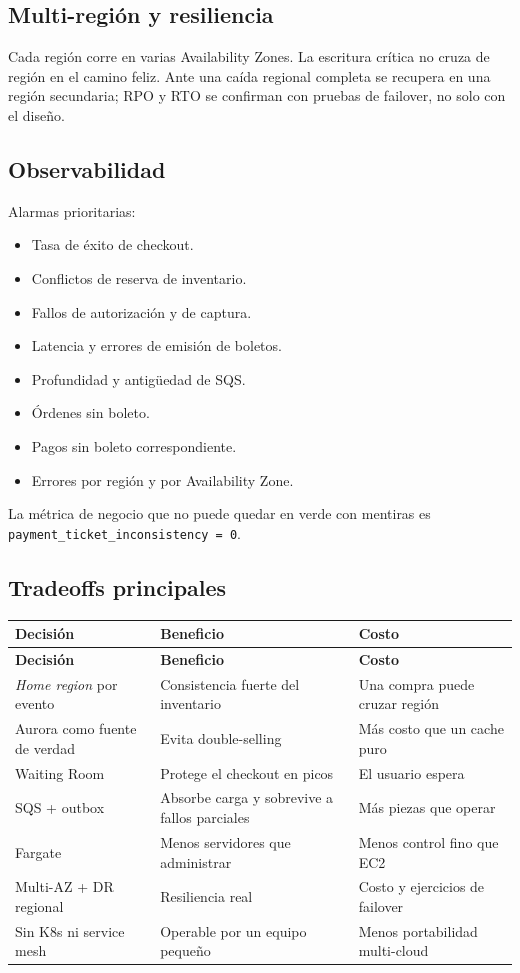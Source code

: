 \documentclass[11pt,a4paper]{article}
\begin{document}
\subsection{Multi-región y resiliencia}

Cada región corre en varias Availability Zones. La escritura crítica no cruza de región en el camino feliz. Ante una caída regional completa se recupera en una región secundaria; RPO y RTO se confirman con pruebas de failover, no solo con el diseño.

\subsection{Observabilidad}

Alarmas prioritarias:

\begin{itemize}
    \item Tasa de éxito de checkout.
    \item Conflictos de reserva de inventario.
    \item Fallos de autorización y de captura.
    \item Latencia y errores de emisión de boletos.
    \item Profundidad y antigüedad de SQS.
    \item Órdenes sin boleto.
    \item Pagos sin boleto correspondiente.
    \item Errores por región y por Availability Zone.
\end{itemize}

La métrica de negocio que no puede quedar en verde con mentiras es \texttt{payment\_ticket\_inconsistency = 0}.

\subsection{Tradeoffs principales}

\begin{longtable}{p{3.8cm} p{5.2cm} p{5.2cm}}
\toprule
\textbf{Decisión} & \textbf{Beneficio} & \textbf{Costo} \\
\midrule
\endfirsthead
\toprule
\textbf{Decisión} & \textbf{Beneficio} & \textbf{Costo} \\
\midrule
\endhead
\textit{Home region} por evento & Consistencia fuerte del inventario & Una compra puede cruzar región \\
Aurora como fuente de verdad & Evita double-selling & Más costo que un cache puro \\
Waiting Room & Protege el checkout en picos & El usuario espera \\
SQS + outbox & Absorbe carga y sobrevive a fallos parciales & Más piezas que operar \\
Fargate & Menos servidores que administrar & Menos control fino que EC2 \\
Multi-AZ + DR regional & Resiliencia real & Costo y ejercicios de failover \\
Sin K8s ni service mesh & Operable por un equipo pequeño & Menos portabilidad multi-cloud \\
\bottomrule
\end{longtable}
\end{document}

